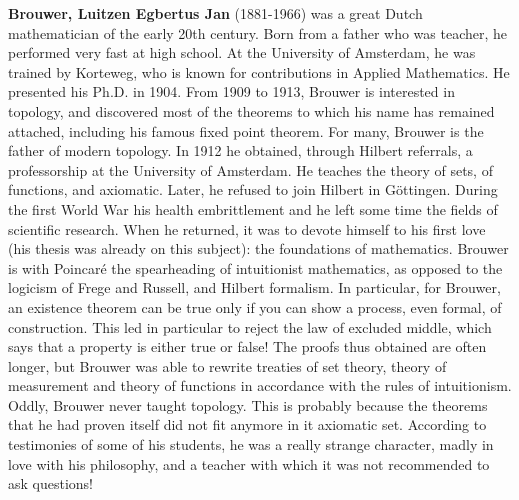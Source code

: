 \textbf{Brouwer, Luitzen Egbertus Jan} (1881-1966) was a great Dutch mathematician of the early 20th century. Born from a father who was teacher, he performed very fast at high school. At the University of Amsterdam, he was trained by Korteweg, who is known for contributions in Applied Mathematics. He presented his Ph.D. in 1904. From 1909 to 1913, Brouwer is interested in topology, and discovered most of the theorems to which his name has remained attached, including his famous fixed point theorem. For many, Brouwer is the father of modern topology. In 1912 he obtained, through Hilbert referrals, a professorship at the University of Amsterdam. He teaches the theory of sets, of functions, and axiomatic. Later, he refused to join Hilbert in Göttingen. During the first World War his health embrittlement and he left some time the fields of scientific research. When he returned, it was to devote himself to his first love (his thesis was already on this subject): the foundations of mathematics. Brouwer is with Poincaré the spearheading of intuitionist mathematics, as opposed to the logicism of Frege and Russell, and Hilbert formalism. In particular, for Brouwer, an existence theorem can be true only if you can show a process, even formal, of construction. This led in particular to reject the law of excluded middle, which says that a property is either true or false! The proofs thus obtained are often longer, but Brouwer was able to rewrite treaties of set theory, theory of measurement and theory of functions in accordance with the rules of intuitionism. Oddly, Brouwer never taught topology. This is probably because the theorems that he had proven itself did not fit anymore in it axiomatic set. According to testimonies of some of his students, he was a really strange character, madly in love with his philosophy, and a teacher with which it was not recommended to ask questions!

{}	

